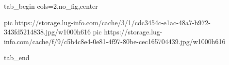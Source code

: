  
 
 
 
 

\ifcmt
  tab_begin cols=2,no_fig,center

     pic https://storage.lug-info.com/cache/3/1/cdc3454c-e1ac-48a7-b972-343fd5214838.jpg/w1000h616%
		 pic https://storage.lug-info.com/cache/f/9/c5b4c8e4-0e81-4f97-80be-cec165704439.jpg/w1000h616%

  tab_end
\fi
